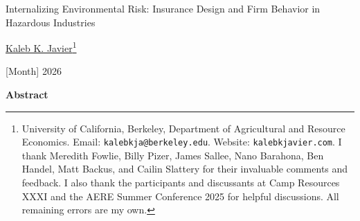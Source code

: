 \documentclass[
  12pt,
]{article}
\author{}
\date{}
\begin{document}
\renewcommand{\thefootnote}{\fnsymbol{footnote}}

\thispagestyle{empty}

\begin{center}
\vspace*{3cm}

{\Large Internalizing Environmental Risk: Insurance Design and Firm Behavior in Hazardous Industries}

\vspace{1cm}

{\normalsize \href{https://www.kalebkjavier.com}{Kaleb K. Javier}\footnote{University of California, Berkeley, Department of Agricultural and Resource Economics. Email: \texttt{kalebkja@berkeley.edu}. Website: \texttt{kalebkjavier.com}. I thank Meredith Fowlie, Billy Pizer, James Sallee, Nano Barahona, Ben Handel, Matt Backus, and Cailin Slattery for their invaluable comments and feedback. I also thank the participants and discussants at Camp Resources XXXI and the AERE Summer Conference 2025 for helpful discussions. All remaining errors are my own.}}

\vspace{0.2cm}

{\normalsize [Month] 2026}

\end{center}

\vspace{.2cm}

\begin{center}
{\small \textbf{Abstract}}
\end{center}
\end{document}

